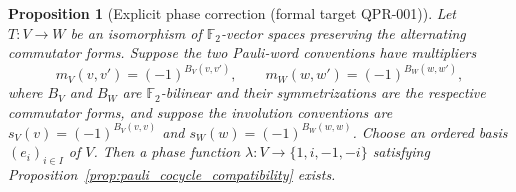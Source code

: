 \documentclass{article}
\newtheorem{proposition}[definition]{Proposition}
\begin{document}
\begin{proposition}[Explicit phase correction (formal target QPR-001)]
\label{prop:explicit_pauli_phase_correction}
Let $T:V\to W$ be an isomorphism of $\mathbb F_2$-vector spaces preserving
the alternating commutator forms.  Suppose the two Pauli-word conventions
have multipliers
\begin{equation*}
  m_V(v,v')=(-1)^{B_V(v,v')},
  \qquad
  m_W(w,w')=(-1)^{B_W(w,w')},
\end{equation*}
where $B_V$ and $B_W$ are $\mathbb F_2$-bilinear and their symmetrizations are
the respective commutator forms, and suppose the involution conventions are
$s_V(v)=(-1)^{B_V(v,v)}$ and
$s_W(w)=(-1)^{B_W(w,w)}$.  Choose an ordered basis $(e_i)_{i\in I}$ of $V$.
Then a phase function $\lambda:V\to\{1,i,-1,-i\}$ satisfying
Proposition~\ref{prop:pauli_cocycle_compatibility} exists.
\end{proposition}
\end{document}
